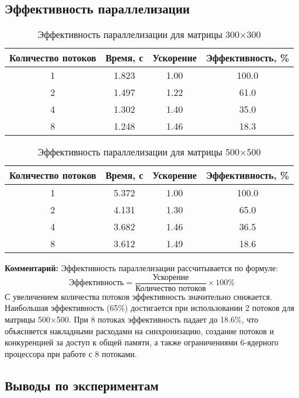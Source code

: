 \subsection{Эффективность параллелизации}

\begin{table}[h]
\centering
\begin{tabular}{|c|c|c|c|}
\hline
\textbf{Количество потоков} & \textbf{Время, с} & \textbf{Ускорение} & \textbf{Эффективность, \%} \\
\hline
1 & 1.823 & 1.00 & 100.0 \\
2 & 1.497 & 1.22 & 61.0 \\
4 & 1.302 & 1.40 & 35.0 \\
8 & 1.248 & 1.46 & 18.3 \\
\hline
\end{tabular}
\caption{Эффективность параллелизации для матрицы 300×300}
\label{tab:efficiency_300}
\end{table}

\begin{table}[h]
\centering
\begin{tabular}{|c|c|c|c|}
\hline
\textbf{Количество потоков} & \textbf{Время, с} & \textbf{Ускорение} & \textbf{Эффективность, \%} \\
\hline
1 & 5.372 & 1.00 & 100.0 \\
2 & 4.131 & 1.30 & 65.0 \\
4 & 3.682 & 1.46 & 36.5 \\
8 & 3.612 & 1.49 & 18.6 \\
\hline
\end{tabular}
\caption{Эффективность параллелизации для матрицы 500×500}
\label{tab:efficiency_500}
\end{table}

\textbf{Комментарий:}
Эффективность параллелизации рассчитывается по формуле: 
\[
\text{Эффективность} = \frac{\text{Ускорение}}{\text{Количество потоков}} \times 100\%
\]
С увеличением количества потоков эффективность значительно снижается. Наибольшая эффективность (65\%) достигается при использовании 2 потоков для матрицы 500×500. При 8 потоках эффективность падает до 18.6\%, что объясняется накладными расходами на синхронизацию, создание потоков и конкуренцией за доступ к общей памяти, а также ограничениями 6-ядерного процессора при работе с 8 потоками.

\subsection{Выводы по экспериментам}

